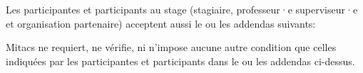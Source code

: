 {Les participantes et participants au stage (stagiaire, professeur·e superviseur·e et organisation partenaire) acceptent aussi le ou les addendas suivants:

Mitacs ne requiert, ne vérifie, ni n'impose aucune autre condition que celles indiquées par les participantes et participants dans le ou les addendas ci-dessus.
}

